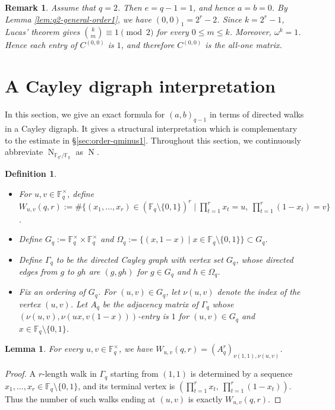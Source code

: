 \documentclass[10pt,a4paper]{article}
\newtheorem{lem}[thm]{Lemma}
\newtheorem{defi}[thm]{Definition}
\newtheorem{remark}[thm]{Remark}
\newcommand{\Norm}{\operatorname{N}}
\numberwithin{equation}{section}
\begin{document}
\begin{remark}\label{rem:q2-all-ones}
Assume that $q=2$. Then $e=q-1=1$, and hence $a=b=0$. By Lemma \ref{lem:q2-general-order1}, we have $(0,0)_1=2^r-2$. Since $k=2^r-1$, Lucas' theorem gives $\binom{k}{m}\equiv 1\pmod 2$ for every $0\le m\le k$. Moreover, $\omega^k=1$. Hence each entry of $C^{(0,0)}$ is $1$, and therefore $C^{(0,0)}$ is the all-one matrix.
\end{remark}

\section{A Cayley digraph interpretation}\label{sec:cayley-digraph}

In this section, we give an exact formula for $(a,b)_{q-1}$ in terms of directed walks in a Cayley digraph. It gives a structural interpretation which is complementary to the estimate in \S\ref{sec:order-qminus1}. Throughout this section, we continuously abbreviate $\Norm_{\mathbb{F}_{q^r}/\mathbb{F}_q}$ as $\Norm$.

\begin{defi}\label{def:Wuv-cayley}
{\,}
\begin{itemize}
\item For $u,v\in \mathbb{F}_q^\times$, define $W_{u,v}(q,r):=\#\{(x_1,\dots,x_r)\in (\mathbb{F}_q\setminus\{0,1\})^r \mid \prod_{t=1}^r x_t=u,\ \prod_{t=1}^r (1-x_t)=v\}$.
\item Define $G_q:=\mathbb{F}_q^\times\times \mathbb{F}_q^\times$ and $\Omega_q:=\{(x,1-x)\mid x\in \mathbb{F}_q\setminus\{0,1\}\}\subset G_q$.
\item Define $\Gamma_q$ to be the directed Cayley graph with vertex set $G_q$, whose directed edges from $g$ to $gh$ are $(g,gh)$ for $g\in G_q$ and $h\in \Omega_q$.
\item Fix an ordering of $G_q$. For $(u,v)\in G_q$, let $\nu(u,v)$ denote the index of the vertex $(u,v)$. Let $A_q$ be the adjacency matrix of $\Gamma_q$ whose $(\nu(u,v),\nu(ux,v(1-x)))$-entry is $1$ for $(u,v)\in G_q$ and $x\in\mathbb{F}_q\setminus\{0,1\}$.
\end{itemize}
\end{defi}

\begin{lem}\label{lem:Wuv-adjacency}
For every $u,v\in \mathbb{F}_q^\times$, we have $W_{u,v}(q,r)=(A_q^r)_{\nu(1,1),\nu(u,v)}$.
\end{lem}

\begin{proof}
A $r$-length walk in $\Gamma_q$ starting from $(1,1)$ is determined by a sequence $x_1,\dots,x_r\in \mathbb{F}_q\setminus\{0,1\}$, and its terminal vertex is $(\prod_{t=1}^r x_t,\ \prod_{t=1}^r (1-x_t))$. Thus the number of such walks ending at $(u,v)$ is exactly $W_{u,v}(q,r)$.
\end{proof}
\end{document}
